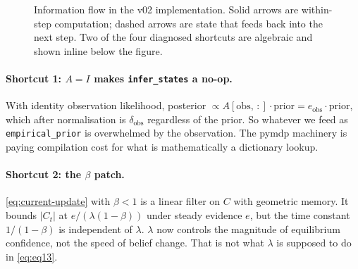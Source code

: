 \documentclass[11pt,a4paper]{article}
\newcommand{\code}[1]{\texttt{\small #1}}
\begin{document}
\begin{figure}[ht]
\caption{Information flow in the v02 implementation. Solid arrows are
within-step computation; dashed arrows are state that feeds back into the
next step. Two of the four diagnosed shortcuts are algebraic and shown
inline below the figure.}
\label{fig:current}
\end{figure}

\paragraph{Shortcut 1: $A = I$ makes \code{infer\_states} a no-op.}
With identity observation likelihood, posterior $\propto A[\text{obs},\,:]\cdot
\text{prior} = e_{\text{obs}}\cdot\text{prior}$, which after normalisation is
$\delta_{\text{obs}}$ regardless of the prior. So whatever we feed as
\code{empirical\_prior} is overwhelmed by the observation. The pymdp
machinery is paying compilation cost for what is mathematically a dictionary
lookup.

\paragraph{Shortcut 2: the $\beta$ patch.}
\eqref{eq:current-update} with $\beta < 1$ is a linear filter on $C$ with
geometric memory. It bounds $|C_t|$ at $e/(\lambda(1-\beta))$ under steady
evidence $e$, but the time constant $1/(1-\beta)$ is independent of $\lambda$.
$\lambda$ now controls the magnitude of equilibrium confidence, not the speed
of belief change. That is not what $\lambda$ is supposed to do in
\eqref{eq:eq13}.
\end{document}

